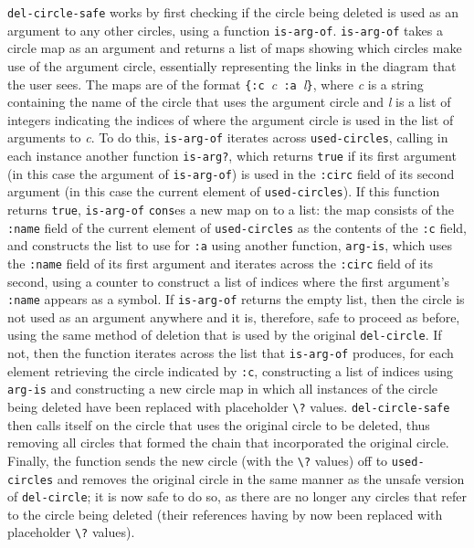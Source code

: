 \documentclass[12pt,twoside,notitlepage,xetex]{report}
\begin{document}
\verb¬del-circle-safe¬ works by first checking if the circle being deleted is
used as an argument to any other circles, using a function \verb¬is-arg-of¬.
\verb¬is-arg-of¬ takes a circle map as an argument and returns a list of maps
showing which circles make use of the argument circle, essentially representing
the links in the diagram that the user sees.  The maps are of the format
\verb¬{:c ¬\emph{c}\verb¬ :a ¬\emph{l}\verb¬}¬, where \emph{c} is a string
containing the name of the circle that uses the argument circle and \emph{l} is
a list of integers indicating the indices of where the argument circle is used
in the list of arguments to \emph{c}.  To do this, \verb¬is-arg-of¬ iterates
across \verb¬used-circles¬, calling in each instance another function
\verb¬is-arg?¬, which returns \verb¬true¬ if its first argument (in this case
the argument of \verb¬is-arg-of¬) is used in the \verb¬:circ¬ field of its
second argument (in this case the current element of \verb¬used-circles¬).  If
this function returns \verb¬true¬, \verb¬is-arg-of¬ \verb¬cons¬es a new map on
to a list: the map consists of the \verb¬:name¬ field of the current element
of \verb¬used-circles¬ as the contents of the \verb¬:c¬ field, and constructs
the list to use for \verb¬:a¬ using another function, \verb¬arg-is¬, which uses
the \verb¬:name¬ field of its first argument and iterates across the
\verb¬:circ¬ field of its second, using a counter to construct a list of
indices where the first argument's \verb¬:name¬ appears as a symbol.  If
\verb¬is-arg-of¬ returns the empty list, then the circle is not used as an
argument anywhere and it is, therefore, safe to proceed as before, using the
same method of deletion that is used by the original \verb¬del-circle¬.  If
not, then the function iterates across the list that \verb¬is-arg-of¬ produces,
for each element retrieving the circle indicated by \verb¬:c¬, constructing a
list of indices using \verb¬arg-is¬ and constructing a new circle map in which
all instances of the circle being deleted have been replaced with placeholder
\verb¬\?¬ values.  \verb¬del-circle-safe¬ then calls itself on the circle that
uses the original circle to be deleted, thus removing all circles that formed
the chain that incorporated the original circle.  Finally, the function sends
the new circle (with the \verb¬\?¬ values) off to \verb¬used-circles¬ and
removes the original circle in the same manner as the unsafe version of
\verb¬del-circle¬; it is now safe to do so, as there are no longer any circles
that refer to the circle being deleted (their references having by now been
replaced with placeholder \verb¬\?¬ values).
\end{document}
